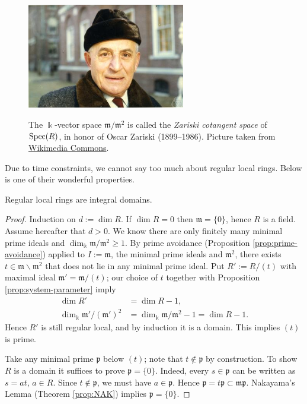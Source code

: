 \begin{figure}[h]
	\centering \includegraphics[height=130pt]{OZariski.jpg} \\ \vspace{1em}
	\begin{minipage}{0.7\textwidth}
		\small The $\Bbbk$-vector space $\mathfrak{m}/\mathfrak{m}^2$ is called the \emph{Zariski cotangent space} of $\operatorname{Spec}(R)$, in honor of Oscar Zariski (1899--1986). Picture taken from \href{https://commons.wikimedia.org/wiki/File:Oscar_Zariski.jpg}{Wikimedia Commons}.
	\end{minipage}
\end{figure}

Due to time constraints, we cannot say too much about regular local rings. Below is one of their wonderful properties.
\begin{theorem}\label{prop:regular-local-domain}
	Regular local rings are integral domains.
\end{theorem}
\begin{proof}
	Induction on $d := \dim R$. If $\dim R=0$ then $\mathfrak{m}=\{0\}$, hence $R$ is a field. Assume hereafter that $d > 0$. We know there are only finitely many minimal prime ideals and $\dim_\Bbbk \mathfrak{m}/\mathfrak{m}^2 \geq 1$. By prime avoidance (Proposition \ref{prop:prime-avoidance}) applied to $I := \mathfrak{m}$, the minimal prime ideals and $\mathfrak{m}^2$, there exists $t \in \mathfrak{m} \smallsetminus \mathfrak{m}^2$ that does not lie in any minimal prime ideal. Put $R' := R/(t)$ with maximal ideal $\mathfrak{m}' = \mathfrak{m}/(t)$; our choice of $t$ together with Proposition \ref{prop:system-parameter} imply
	\begin{align*}
		\dim R' & = \dim R - 1, \\
		\dim_\Bbbk \mathfrak{m}'/(\mathfrak{m}')^2 & = \dim_\Bbbk \mathfrak{m}/\mathfrak{m}^2 - 1 = \dim R - 1.
	\end{align*}
	Hence $R'$ is still regular local, and by induction it is a domain. This implies $(t)$ is prime.
	
	Take any minimal prime $\mathfrak{p}$ below $(t)$; note that $t \notin \mathfrak{p}$ by construction. To show $R$ is a domain it suffices to prove $\mathfrak{p}=\{0\}$. Indeed, every $s \in \mathfrak{p}$ can be written as $s=at$, $a \in R$. Since $t \notin \mathfrak{p}$, we must have $a \in \mathfrak{p}$. Hence $\mathfrak{p}=t\mathfrak{p} \subset \mathfrak{m}\mathfrak{p}$. Nakayama's Lemma (Theorem \ref{prop:NAK}) implies $\mathfrak{p} = \{0\}$.
\end{proof}